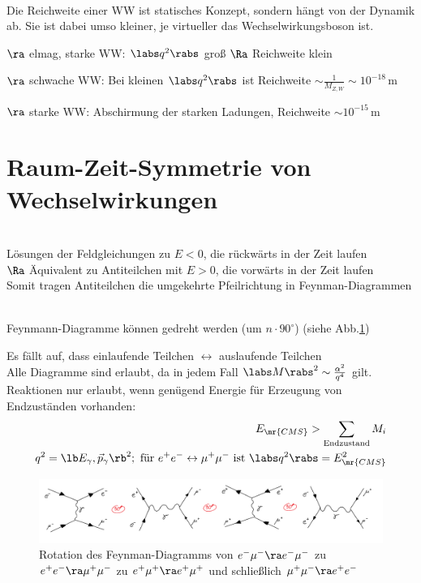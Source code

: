 \\
Die Reichweite einer WW ist  statisches Konzept, sondern hängt von der Dynamik ab. Sie ist dabei umso kleiner, je \glqq virtueller\grqq{} das Wechselwirkungsboson ist.
\begin{compactitem}
\item[$\ra$] elmag, starke WW: $\labs q^2 \rabs$ groß $\Ra$ Reichweite klein
\item[$\ra$] schwache WW: Bei kleinen $\labs q^2\rabs$ ist Reichweite $\sim \frac{1}{M_{Z,W}} \sim 10^{-18}$\,m
\item[$\ra$] starke WW: Abschirmung der starken Ladungen, Reichweite $\sim 10^{-15}$\,m
\end{compactitem}
\section{Raum-Zeit-Symmetrie von Wechselwirkungen}
\\
Lösungen der Feldgleichungen zu $E<0$, die rückwärts in der Zeit laufen\\
$\Ra$ Äquivalent zu Antiteilchen mit $E>0$, die vorwärts in der Zeit laufen\\
Somit tragen Antiteilchen die \glqq umgekehrte Pfeilrichtung\grqq{} in Feynman-Diagrammen

\\
Feynmann-Diagramme \glqq können gedreht\grqq{} werden (um $n\cdot 90^\circ$) (siehe Abb.\ref{fig:2.9})

 Es fällt auf, dass einlaufende Teilchen $\leftrightarrow$ auslaufende Teilchen\\
Alle Diagramme sind erlaubt, da in jedem Fall $\labs M\rabs^2 \sim \frac{\alpha^2}{q^4}$ gilt.\\
 Reaktionen nur erlaubt, wenn genügend Energie für Erzeugung von Endzuständen vorhanden:
\begin{align}
\begin{split}
E_\mr{CMS} > \sum_\text{Endzustand} M_i\\
q^2 = \lb E_\gamma, \vec{p}_\gamma \rb ^2; \text{ für } e^+e^- \leftrightarrow \mu^+\mu^- \text{ ist } \labs q^2 \rabs = E^2_\mr{CMS}
\end{split}
\end{align}
\begin{figure}[!ht]
\centering
\includegraphics[width=\textwidth]{imgs/ep5-fig-2-9.pdf}
\caption{Rotation des Feynman-Diagramms von $e^-\mu^- \ra e^-\mu^-$ zu $e^+e^- \ra \mu^+\mu^-$ zu $e^+\mu^+ \ra e^+\mu^+$ und schließlich $\mu^+\mu^- \ra e^+e^-$ \label{fig:2.9}}
\end{figure}

